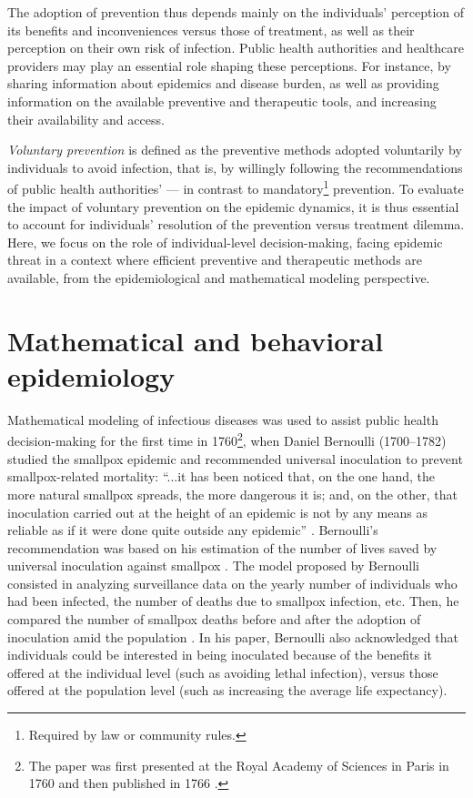 The adoption of prevention thus depends mainly on the individuals' perception of its benefits and inconveniences versus those of treatment, as well as their perception on their own risk of infection. Public health authorities and healthcare providers may play an essential role shaping these perceptions. For instance, by sharing information about epidemics and disease burden, as well as providing information on the available preventive and therapeutic tools, and increasing their availability and access.%

\textit{Voluntary prevention} is defined as the preventive methods adopted voluntarily by individuals to avoid infection, that is, by willingly following the recommendations of public health authorities' --- in contrast to mandatory\footnote{Required by law or community rules.} prevention. To evaluate the impact of voluntary prevention on the epidemic dynamics, it is thus essential to account for individuals' resolution of the prevention versus treatment dilemma. Here, we focus on the role of individual-level decision-making, facing epidemic threat in a context where efficient preventive and therapeutic methods are available, from the epidemiological and mathematical modeling perspective.

\section{Mathematical and behavioral epidemiology}
\label{Intro:BehavEpi} 

Mathematical modeling of infectious diseases was used to assist public health decision-making for the first time in 1760\footnote{The paper was first presented at the Royal Academy of Sciences in Paris in 1760 and then published in 1766 \cite[]{Bernoulli1766}.}, when Daniel Bernoulli (1700--1782) studied the smallpox epidemic and recommended universal inoculation to prevent smallpox-related mortality: ``...it has been noticed that, on the one hand, the more natural smallpox spreads, the more dangerous it is; and, on the other, that inoculation carried out at the height of an epidemic is not by any means as reliable as if it were done quite outside any epidemic'' \cite[]{Blower2004}. Bernoulli's recommendation was based on his estimation of the number of lives saved by universal inoculation against smallpox \cite[]{Blower2004}. The model proposed by Bernoulli consisted in analyzing surveillance data on the yearly number of individuals who had been infected, the number of deaths due to smallpox infection, etc. Then, he compared the number of smallpox deaths before and after the adoption of inoculation amid the population \cite[]{Blower2004,Dietz2002}. In his paper, Bernoulli also acknowledged that individuals could be interested in being inoculated because of the benefits it offered at the individual level (such as avoiding lethal infection), versus those offered at the population level (such as increasing the average life expectancy).

